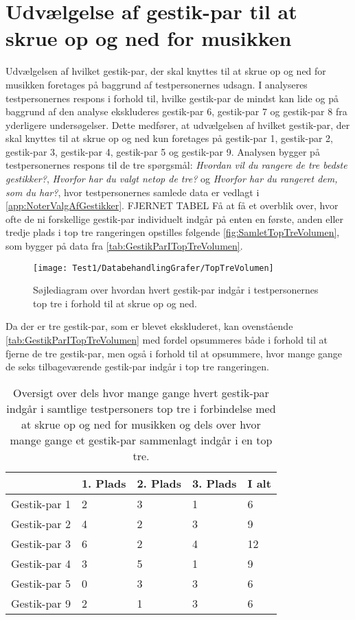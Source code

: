 \section{Udvælgelse af gestik-par til at skrue op og ned for musikken}
\label{TestresultaterVolumen}
%
Udvælgelsen af hvilket gestik-par, der skal knyttes til at skrue op og ned for musikken foretages på baggrund af testpersonernes udsagn. I  analyseres testpersonernes respons i forhold til, hvilke gestik-par de mindst kan lide og på baggrund af den analyse ekskluderes gestik-par 6, gestik-par 7 og gestik-par 8 fra yderligere undersøgelser. Dette medfører, at udvælgelsen af hvilket gestik-par, der skal knyttes til at skrue op og ned kun foretages på gestik-par 1, gestik-par 2, gestik-par 3, gestik-par 4, gestik-par 5 og gestik-par 9. Analysen bygger på testpersonernes respons til de tre spørgsmål: \textit{Hvordan vil du rangere de tre bedste gestikker?}, \textit{Hvorfor har du valgt netop de tre?} og \textit{Hvorfor har du rangeret dem, som du har?}, hvor testpersonernes samlede data er vedlagt i \autoref{app:NoterValgAfGestikker}. \blankline
%  
FJERNET TABEL
%
Få at få et overblik over, hvor ofte de ni forskellige gestik-par individuelt indgår på enten en første, anden eller tredje plads i top tre rangeringen opstilles følgende \autoref{fig:SamletTopTreVolumen}, som bygger på data fra \autoref{tab:GestikParITopTreVolumen}. 
%
\begin{figure}[H]
	\centering
	\texttt{[image: Test1/DatabehandlingGrafer/TopTreVolumen]}
	\caption{Søjlediagram over hvordan hvert gestik-par indgår i testpersonernes top tre i forhold til at skrue op og ned.}
	\label{fig:SamletTopTreVolumen}
\end{figure}
\noindent
%
Da der er tre gestik-par, som er blevet ekskluderet, kan ovenstående  \autoref{tab:GestikParITopTreVolumen} med fordel opsummeres både i forhold til at fjerne de tre gestik-par, men også i forhold til at opsummere, hvor mange gange de seks tilbageværende gestik-par indgår i top tre rangeringen. 
%
\begin{table}[H]
	\centering
	\begin{tabular}{ | p{2.4cm} | p{2.4cm} | p{2.4cm} | p{2.4cm} |p{2.4cm}|}
		\hline
		& 1. Plads & 2. Plads & 3. Plads & I alt \\ \hline
		Gestik-par 1 & 2 & 3 & 1 & 6\\ \hline
		Gestik-par 2 & 4 & 2 & 3 & 9\\ \hline
		Gestik-par 3 & 6 & 2 & 4 & 12\\ \hline
		Gestik-par 4 & 3 & 5 & 1 & 9\\ \hline 
		Gestik-par 5 & 0 & 3 & 3 & 6\\ \hline
		Gestik-par 9 & 2 & 1 & 3 & 6\\ \hline
	\end{tabular}
	\caption{Oversigt over dels hvor mange gange hvert gestik-par indgår i samtlige testpersoners top tre i forbindelse med at skrue op og ned for musikken og dels over hvor mange gange et gestik-par sammenlagt indgår i en top tre.}
	\label{tab:GestikParITopTreVolumenOversigt}
\end{table}
